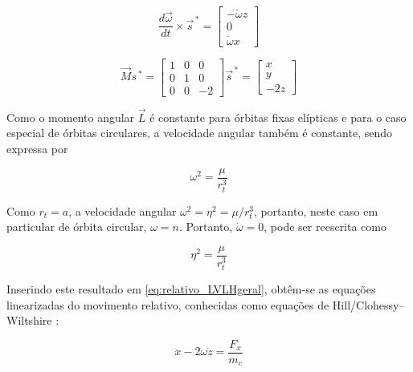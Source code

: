 \begin{equation}
\label{eq:dOmega_cross_s}
\frac{d\vec\omega}{dt} \times \vec s^{\,*} 
=
\begin{bmatrix}
-\dot\omega z \\
0              \\
\dot\omega x
\end{bmatrix}
\end{equation}

\begin{equation}
\label{eq:jacobiana_LVLH}
\vec{M}s^{\,*} 
=
\begin{bmatrix}
    1 & 0 & 0 \\
    0 & 1 & 0  \\
    0 & 0 & -2
\end{bmatrix}
\vec s^{\,*} 
=
\begin{bmatrix}
x \\
y \\
-2z
\end{bmatrix}
\end{equation}


Como o momento angular $\vec{L}$ é constante para órbitas fixas elípticas e para o caso especial de órbitas circulares, a velocidade angular também é constante, sendo expressa por 

\begin{equation}
\label{eq:omega_constante1}
\omega^2 = \frac{\mu}{r_t^3}
\end{equation}

Como $r_t=a$, a velocidade angular $\omega^{2}= \eta^2 = \mu/r_t^{3}$, portanto, neste caso em particular de órbita circular, $\omega=n$.
Portanto, $\dot{\omega}=0$, pode ser reescrita como

\begin{equation}
\label{eq:omega_constante2}
\eta^2 = \frac{\mu}{r_t^3}
\end{equation}

Inserindo este resultado em \eqref{eq:relativo_LVLHgeral}, obtêm-se as equações linearizadas do movimento relativo, conhecidas como equações de Hill/Clohessy--Wiltshire \cite{hill1878,fehse2003,wie2008space}:

\begin{equation}
    \label{eq:equacoes_HillX}
\ddot{x} - 2\omega \dot{z} = \frac{F_x}{m_c}
\end{equation}

